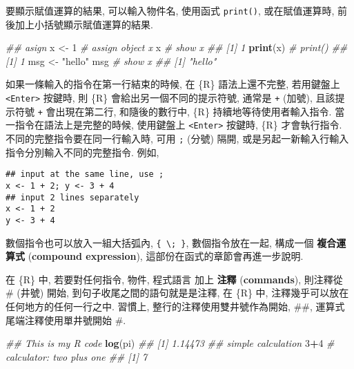 \documentclass[
]{book}
\newenvironment{Shaded}{\begin{snugshade}}{\end{snugshade}}
\newcommand{\CommentTok}[1]{\textcolor[rgb]{0.56,0.35,0.01}{\textit{#1}}}
\newcommand{\DecValTok}[1]{\textcolor[rgb]{0.00,0.00,0.81}{#1}}
\newcommand{\KeywordTok}[1]{\textcolor[rgb]{0.13,0.29,0.53}{\textbf{#1}}}
\newcommand{\NormalTok}[1]{#1}
\newcommand{\OperatorTok}[1]{\textcolor[rgb]{0.81,0.36,0.00}{\textbf{#1}}}
\newcommand{\StringTok}[1]{\textcolor[rgb]{0.31,0.60,0.02}{#1}}
\begin{document}
要顯示賦值運算的結果,
可以輸入物件名,
使用函式 \texttt{print()},
或在賦值運算時, 前後加上小括號顯示賦值運算的結果.

\begin{Shaded}
\begin{Highlighting}[]
\CommentTok{\#\# asign          }
\NormalTok{x \textless{}{-}}\StringTok{ }\DecValTok{1}   \CommentTok{\# assign object x           }
\NormalTok{x        }\CommentTok{\# show x             }
\CommentTok{\#\# [1] 1}
\KeywordTok{print}\NormalTok{(x) }\CommentTok{\# print()                  }
\CommentTok{\#\# [1] 1}
\NormalTok{msg \textless{}{-}}\StringTok{ "hello"}                   
\NormalTok{msg     }\CommentTok{\# show x                     }
\CommentTok{\#\# [1] "hello"}
\end{Highlighting}
\end{Shaded}

如果一條輸入的指令在第一行結束的時候,
在 \{R\} 語法上還不完整,
若用鍵盤上 \texttt{\textless{}Enter\textgreater{}} 按鍵時,
則
\{R\} 會給出另一個不同的提示符號,
通常是 \texttt{+} (加號),
且該提示符號 \texttt{+} 會出現在第二行,
和隨後的數行中,
\{R\} 持續地等待使用者輸入指令.
當一指令在語法上是完整的時候,
使用鍵盤上 \texttt{\textless{}Enter\textgreater{}} 按鍵時,
\{R\} 才會執行指令.
不同的完整指令要在同一行輸入時,
可用 \texttt{;} (分號) 隔開, 或是另起一新輸入行輸入指令分別輸入不同的完整指令.
例如,

\begin{verbatim}
## input at the same line, use ;
x <- 1 + 2; y <- 3 + 4
## input 2 lines separately  
x <- 1 + 2
y <- 3 + 4
\end{verbatim}

數個指令也可以放入一組大括弧內,
\texttt{\{\ \textbackslash{};\ \}},
數個指令放在一起,
構成一個
\textbf{複合運算式}
(\textbf{compound expression}),
這部份在函式的章節會再進一步說明.

在 \{R\} 中, 若要對任何指令, 物件, 程式語言
加上
\textbf{注釋}
(\textbf{commands}),
則注釋從 \# (井號) 開始, 到句子收尾之間的語句就是是注釋,
在 \{R\} 中,
注釋幾乎可以放在任何地方的任何一行之中.
習慣上, 整行的注釋使用雙井號作為開始, \#\#,
運算式尾端注釋使用單井號開始 \#.

\begin{Shaded}
\begin{Highlighting}[]
\CommentTok{\#\# This is my R code}
\KeywordTok{log}\NormalTok{(pi)}
\CommentTok{\#\# [1] 1.14473}
\CommentTok{\#\# simple calculation}
\DecValTok{3}\OperatorTok{+}\DecValTok{4} \CommentTok{\# calculator: two plus one}
\CommentTok{\#\# [1] 7}
\end{Highlighting}
\end{Shaded}
\end{document}
